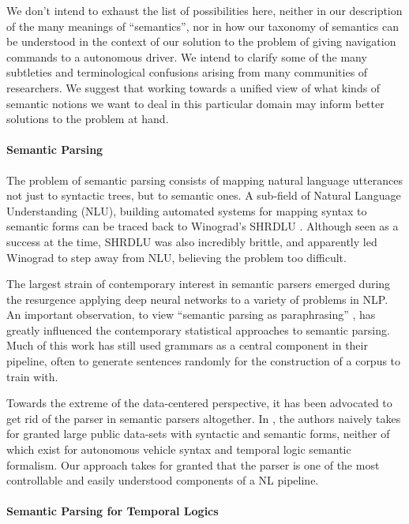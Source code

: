 \documentclass[a4paper, 11pt]{article}
\begin{document}
We don't intend to exhaust the list of possibilities here, neither in our
description of the many meanings of ``semantics'', nor in how our taxonomy of
semantics can be understood in the context of our solution to the problem of
giving navigation commands to a autonomous driver. We intend to clarify some of
the many subtleties and terminological confusions arising from many
communities of researchers. We suggest that working towards a unified view of
what kinds of semantic notions we want to deal in this particular domain may
inform better solutions to the problem at hand.

\paragraph{Semantic Parsing}

The problem of semantic parsing consists of mapping natural language utterances
not just to syntactic trees, but to semantic ones. A sub-field of Natural
Language Understanding (NLU), building automated systems for mapping syntax to
semantic forms can be traced back to Winograd's SHRDLU
\cite{winograd1971procedures}. Although seen as a success at the time, SHRDLU
was also incredibly brittle, and apparently led Winograd to step away from NLU,
believing the problem too difficult.

The largest strain of contemporary interest in semantic parsers emerged during
the resurgence applying deep neural networks to a variety of problems in NLP.
An important observation, to view ``semantic parsing as paraphrasing''
\cite{berant-liang-2014-semantic}, has greatly influenced the contemporary
statistical approaches to semantic parsing. Much of this work has still used
grammars as a central component in their  pipeline, often to generate sentences
randomly for the construction of a corpus to train with.

Towards the extreme of the data-centered perspective, it has been advocated to
get rid of the parser in semantic parsers altogether. In \cite{dontParse}, the
authors naively takes for granted large public data-sets with syntactic and
semantic forms, neither of which exist for autonomous vehicle syntax and
temporal logic semantic formalism. Our approach takes for granted that the
parser is one of the most controllable and easily understood components of a NL
pipeline.

\paragraph{Semantic Parsing for Temporal Logics}
\end{document}
